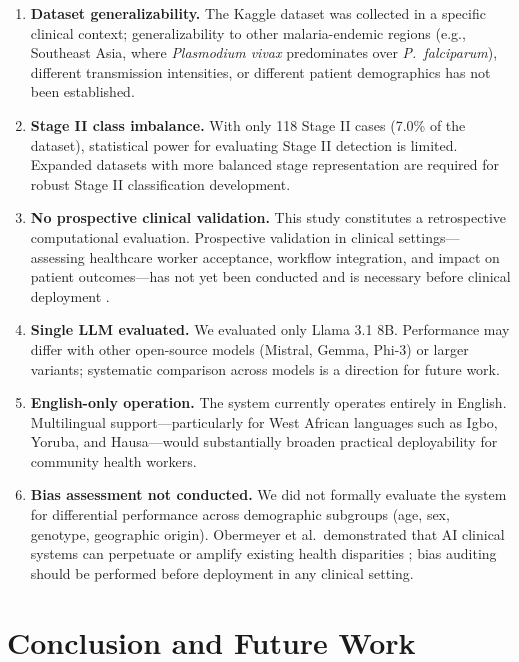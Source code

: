 \documentclass[12pt,a4paper]{article}
\begin{document}
\begin{enumerate}
  \item \textbf{Dataset generalizability.} The Kaggle dataset was collected in a specific clinical context; generalizability to other malaria-endemic regions (e.g., Southeast Asia, where \textit{Plasmodium vivax} predominates over \textit{P.\ falciparum}), different transmission intensities, or different patient demographics has not been established.

  \item \textbf{Stage II class imbalance.} With only 118 Stage II cases (7.0\% of the dataset), statistical power for evaluating Stage II detection is limited. Expanded datasets with more balanced stage representation are required for robust Stage II classification development.

  \item \textbf{No prospective clinical validation.} This study constitutes a retrospective computational evaluation. Prospective validation in clinical settings---assessing healthcare worker acceptance, workflow integration, and impact on patient outcomes---has not yet been conducted and is necessary before clinical deployment \cite{ref29}.

  \item \textbf{Single LLM evaluated.} We evaluated only Llama 3.1 8B. Performance may differ with other open-source models (Mistral, Gemma, Phi-3) or larger variants; systematic comparison across models is a direction for future work.

  \item \textbf{English-only operation.} The system currently operates entirely in English. Multilingual support---particularly for West African languages such as Igbo, Yoruba, and Hausa---would substantially broaden practical deployability for community health workers.

  \item \textbf{Bias assessment not conducted.} We did not formally evaluate the system for differential performance across demographic subgroups (age, sex, genotype, geographic origin). Obermeyer et al.\ demonstrated that AI clinical systems can perpetuate or amplify existing health disparities \cite{ref28}; bias auditing should be performed before deployment in any clinical setting.
\end{enumerate}

\section{Conclusion and Future Work}
\label{sec:conclusion}
\end{document}

